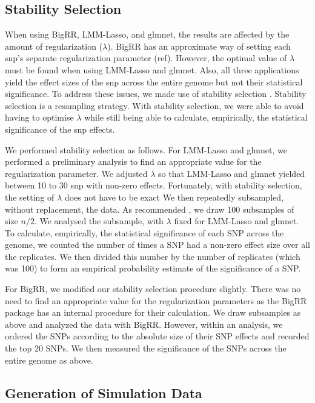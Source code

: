 \documentclass{article}
\begin{document}
\subsection{Stability Selection}
When using BigRR, LMM-Lasso, and glmnet, the results are affected by the amount of regularization ($\lambda$). 
BigRR has an approximate way of setting each snp's separate regularization parameter (ref). However, the optimal value of 
$\lambda$ must be found when using LMM-Lasso and glmnet. Also, 
all three applications yield the effect sizes of the snp across the entire genome but not their statistical significance. To address 
these issues, we made use of stability selection \cite{meinshausen2010stability}. 
Stability selection is a resampling strategy.  With stability selection, we were able to avoid having to optimise $\lambda$ while 
still being able to calculate, empirically, the statistical significance of the snp effects.

We performed stability selection as follows. For LMM-Lasso and glmnet, we performed a preliminary analysis to find an 
appropriate value for the regularization parameter.  We adjusted $\lambda$ so that LMM-Lasso and glmnet yielded 
between 10 to 30 snp with non-zero effects. Fortunately, with stability selection, the setting of $\lambda$ does not have to be exact 
 We then repeatedly subsampled, 
without replacement, the data. As recommended \cite{meinshausen2010stability}, we draw 100 subsamples of size $n/2$. We 
analysed the subsample, with $\lambda$ fixed for LMM-Lasso and glmnet.  To calculate, empirically,  the statistical significance of each 
SNP across the genome, we counted the number of times a SNP had a non-zero effect size over all the replicates. We then 
divided this number by the number of replicates (which was 100) to form an empirical probability estimate of the significance of a SNP. 


For BigRR, we modified our stability selection procedure slightly. 
There was no need to find an appropriate value for the regularization 
parameters as the BigRR package has an internal procedure for their 
calculation. We draw subsamples as above and analyzed the data with BigRR. However, within an analysis, we ordered 
the SNPs according to the absolute size of their SNP effects and recorded the top 20 SNPs. We then measured the significance 
of the SNPs across the entire genome as above. 



\subsection{Generation of Simulation Data}
\end{document}

